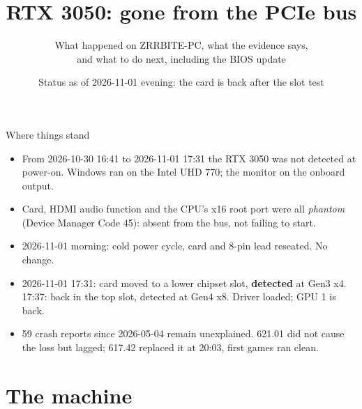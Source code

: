 \documentclass[aspectratio=169,11pt]{beamer}
\title[RTX 3050 failure]{RTX 3050: gone from the PCIe bus}
\subtitle{What happened on ZRRBITE-PC, what the evidence says,\\
  and what to do next, including the BIOS update}
\date{Status as of 2026-11-01 evening: the card is back after the slot test}
\begin{document}
\begin{frame}[plain]\titlepage\end{frame}

\begin{frame}{Where things stand}
  \begin{itemize}\setlength{\itemsep}{0.2em}
    \item From 2026-10-30 16:41 to 2026-11-01 17:31 the RTX 3050 was not detected at power-on.
      Windows ran on the Intel UHD 770; the monitor on the onboard output.
    \item Card, HDMI audio function and the CPU's x16 root port were all \emph{phantom}
      (Device Manager Code 45): absent from the bus, not failing to start.
    \item 2026-11-01 morning: cold power cycle, card and 8-pin lead reseated. No change.
    \item 2026-11-01 17:31: card moved to a lower chipset slot, \textbf{detected} at Gen3 x4.
      17:37: back in the top slot, detected at Gen4 x8. Driver loaded; GPU 1 is back.
    \item 59 crash reports since 2026-05-04 remain unexplained. 621.01 did not cause the loss
      but lagged; 617.42 replaced it at 20:03, first games ran clean.
  \end{itemize}
\end{frame}

\section{The machine}
\end{document}
